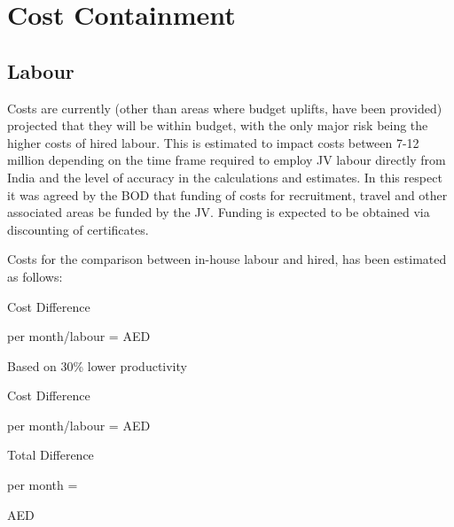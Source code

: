 \documentclass[border=5mm,twocolumn]{report}
\begin{document}
\section{Cost Containment}

\subsection{Labour}

Costs are currently (other than areas where budget uplifts, have been provided) projected that they will be within budget, with the only major risk being the higher costs of hired labour. This is estimated to impact costs between 7-12 million depending on the time frame required to employ JV labour directly from India and the level of accuracy in the calculations and estimates. In this respect it was agreed by the BOD that funding of costs for recruitment, travel and other associated areas be funded by the JV. Funding is expected to be obtained via discounting of certificates.

Costs for the comparison between in-house labour and hired, has been estimated as follows:

\begin{description}
\small
\item [Based on normal site productivity]
\end{description}
Cost Difference \par
       per month/labour =  AED 




\begin{description}
\item[Based on 30\% lower productivity]
\end{description}
Cost Difference \par
       per month/labour =  AED 

Total Difference\par
       per month    =  
       AED
       
\end{document}
